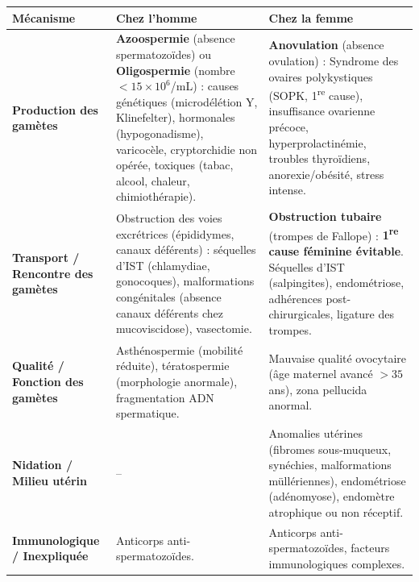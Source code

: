 \documentclass[11pt]{article}
\begin{document}
\begin{propriete}
\begin{center}
\begin{tabularx}{\linewidth}{|l|X|X|}\hline
\rowcolor{popblueL} \textbf{Mécanisme} & \textbf{Chez l'homme} & \textbf{Chez la femme} \\ \hline
\textbf{Production des gamètes} & \textbf{Azoospermie} (absence spermatozoïdes) ou \textbf{Oligospermie} (nombre $< 15 \times 10^6$/mL) : causes génétiques (microdélétion Y, Klinefelter), hormonales (hypogonadisme), varicocèle, cryptorchidie non opérée, toxiques (tabac, alcool, chaleur, chimiothérapie). & \textbf{Anovulation} (absence ovulation) : Syndrome des ovaires polykystiques (SOPK, 1\textsuperscript{re} cause), insuffisance ovarienne précoce, hyperprolactinémie, troubles thyroïdiens, anorexie/obésité, stress intense. \\ \hline
\textbf{Transport / Rencontre des gamètes} & Obstruction des voies excrétrices (épididymes, canaux déférents) : séquelles d'IST (chlamydiae, gonocoques), malformations congénitales (absence canaux déférents chez mucoviscidose), vasectomie. & \textbf{Obstruction tubaire} (trompes de Fallope) : \textbf{1\textsuperscript{re} cause féminine évitable}. Séquelles d'IST (salpingites), endométriose, adhérences post-chirurgicales, ligature des trompes. \\ \hline
\textbf{Qualité / Fonction des gamètes} & Asthénospermie (mobilité réduite), tératospermie (morphologie anormale), fragmentation ADN spermatique. & Mauvaise qualité ovocytaire (âge maternel avancé $> 35$ ans), zona pellucida anormal. \\ \hline
\textbf{Nidation / Milieu utérin} & -- & Anomalies utérines (fibromes sous-muqueux, synéchies, malformations müllériennes), endométriose (adénomyose), endomètre atrophique ou non réceptif. \\ \hline
\textbf{Immunologique / Inexpliquée} & Anticorps anti-spermatozoïdes. & Anticorps anti-spermatozoïdes, facteurs immunologiques complexes. \\ \hline
\end{tabularx}
\end{center}
\end{propriete}
\end{document}
